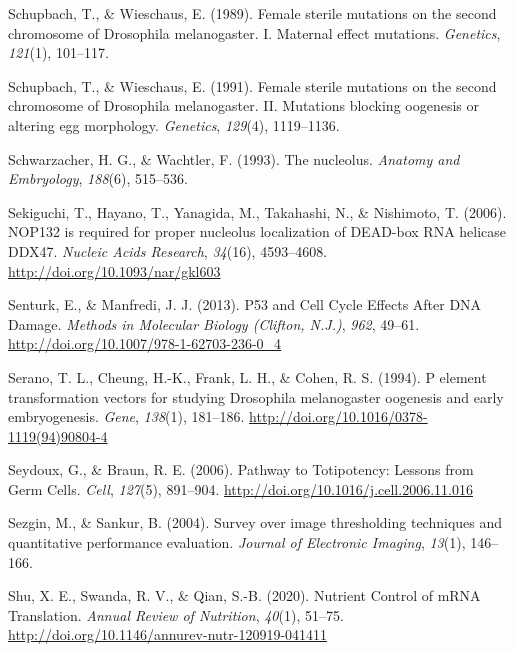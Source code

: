 \documentclass[12pt,oneside]{reedthesis}
\newlength{\cslhangindent}
\newenvironment{cslreferences}%
  {\setlength{\parindent}{0pt}%
  \everypar{\setlength{\hangindent}{\cslhangindent}}\ignorespaces}%
  {\par}
\begin{document}
\begin{cslreferences}
\leavevmode\hypertarget{ref-Schupbach1989c}{}%
Schupbach, T., \& Wieschaus, E. (1989). Female sterile mutations on the second chromosome of Drosophila melanogaster. I. Maternal effect mutations. \emph{Genetics}, \emph{121}(1), 101--117.

\leavevmode\hypertarget{ref-Schupbach1991f}{}%
Schupbach, T., \& Wieschaus, E. (1991). Female sterile mutations on the second chromosome of Drosophila melanogaster. II. Mutations blocking oogenesis or altering egg morphology. \emph{Genetics}, \emph{129}(4), 1119--1136.

\leavevmode\hypertarget{ref-Schwarzacher1993}{}%
Schwarzacher, H. G., \& Wachtler, F. (1993). The nucleolus. \emph{Anatomy and Embryology}, \emph{188}(6), 515--536.

\leavevmode\hypertarget{ref-sekiguchiNOP132RequiredProper2006}{}%
Sekiguchi, T., Hayano, T., Yanagida, M., Takahashi, N., \& Nishimoto, T. (2006). NOP132 is required for proper nucleolus localization of DEAD-box RNA helicase DDX47. \emph{Nucleic Acids Research}, \emph{34}(16), 4593--4608. \url{http://doi.org/10.1093/nar/gkl603}

\leavevmode\hypertarget{ref-senturkP53CellCycle2013}{}%
Senturk, E., \& Manfredi, J. J. (2013). P53 and Cell Cycle Effects After DNA Damage. \emph{Methods in Molecular Biology (Clifton, N.J.)}, \emph{962}, 49--61. \url{http://doi.org/10.1007/978-1-62703-236-0_4}

\leavevmode\hypertarget{ref-seranoElementTransformationVectors1994}{}%
Serano, T. L., Cheung, H.-K., Frank, L. H., \& Cohen, R. S. (1994). P element transformation vectors for studying Drosophila melanogaster oogenesis and early embryogenesis. \emph{Gene}, \emph{138}(1), 181--186. \url{http://doi.org/10.1016/0378-1119(94)90804-4}

\leavevmode\hypertarget{ref-Seydoux2006}{}%
Seydoux, G., \& Braun, R. E. (2006). Pathway to Totipotency: Lessons from Germ Cells. \emph{Cell}, \emph{127}(5), 891--904. \url{http://doi.org/10.1016/j.cell.2006.11.016}

\leavevmode\hypertarget{ref-sezginSurveyImageThresholding2004}{}%
Sezgin, M., \& Sankur, B. (2004). Survey over image thresholding techniques and quantitative performance evaluation. \emph{Journal of Electronic Imaging}, \emph{13}(1), 146--166.

\leavevmode\hypertarget{ref-shuNutrientControlMRNA2020}{}%
Shu, X. E., Swanda, R. V., \& Qian, S.-B. (2020). Nutrient Control of mRNA Translation. \emph{Annual Review of Nutrition}, \emph{40}(1), 51--75. \url{http://doi.org/10.1146/annurev-nutr-120919-041411}


\end{cslreferences}
\end{document}
